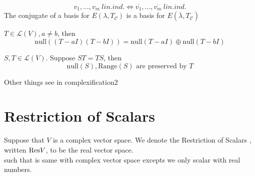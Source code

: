 \documentclass{aq-notes}
\newcommand{\res}{\mbox{\normalfont Res}}
\begin{document}
\begin{remark}
    \[v_1,...,v_m\ lin.ind. \iff \overline{v_1},...,\overline{v_m}\ lin.ind.\]
    The conjugate of a basis for $E(\lambda, T_\mathcal{C})$ is a basis for $E(\overline{\lambda}, T_\mathcal{C})$
\end{remark}
    \begin{lemma}
    $T\in \mathcal{L}(V), a\neq b$, then \[\mbox{null}((T-aI)(T-bI)) = \mbox{null}(T-aI)\oplus\mbox{null}(T-bI)\]
    \end{lemma}
    \begin{lemma}
    $S,T\in \mathcal{L}(V)$. Suppose $ST=TS$, then 
    \[\mbox{null}(S), \mbox{Range}(S) \mbox{ are preserved by }T\]
    \end{lemma}
Other things see in complexification2
\section{Restriction of Scalars}
\begin{definition}
    Suppose that $V$ is a complex vector space. We denote the Restriction of Scalars , written $\res{V}$, to be the real vector space.\\
    such that is same with complex vector space excepts we only scalar with real numbers.
\end{definition}
\end{document}
